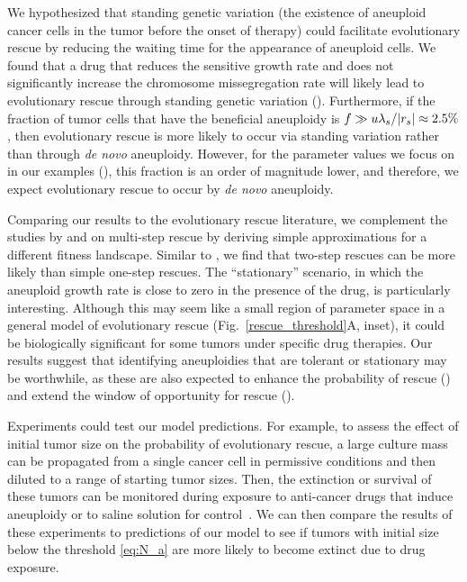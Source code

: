 \documentclass[12pt]{extarticle}
\renewcommand{\Delta}{r}
\begin{document}
We hypothesized that standing genetic variation (the existence of aneuploid cancer cells in the tumor before the onset of therapy) could facilitate evolutionary rescue by reducing the waiting time for the appearance of aneuploid cells. We found that a drug that reduces the sensitive growth rate and does not significantly increase the chromosome missegregation rate will likely lead to evolutionary rescue through standing genetic variation ().
Furthermore, if the fraction of tumor cells that have the beneficial aneuploidy is $f \gg u \lambda_s / \abs{\Delta_s} \approx2.5\%$, then evolutionary rescue is more likely to occur via standing variation rather than through \textit{de novo} aneuploidy. 
However, for the parameter values we focus on in our examples (), this fraction is an order of magnitude lower, and therefore, we expect evolutionary rescue to occur by \textit{de novo} aneuploidy.

Comparing our results to the evolutionary rescue literature, we complement the studies by \citet{iwasa2003evolutionary} and \citet{osmond_genetic_2020} on multi-step rescue by deriving simple approximations for a different fitness landscape. 
Similar to \citet{osmond_genetic_2020}, we find that two-step rescues can be more likely than simple one-step rescues. 
The ``stationary'' scenario, in which the aneuploid growth rate is close to zero in the presence of the drug, is particularly interesting.
Although this may seem like a small region of parameter space in a general model of evolutionary rescue (Fig.~\ref{rescue_threshold}A, inset), it could be biologically significant for some tumors under specific drug therapies.
Our results suggest that identifying aneuploidies that are tolerant or stationary may be worthwhile, as these are also expected to enhance the probability of rescue () and extend the window of opportunity for rescue ().

Experiments could test our model predictions. For example, to assess the effect of initial tumor size on the probability of evolutionary rescue, a large culture mass can be propagated from a single cancer cell in permissive conditions and then diluted to a range of starting tumor sizes. Then, the extinction or survival of these tumors can be monitored during exposure to anti-cancer drugs that induce aneuploidy or to saline solution for control~\citep{ippolito2021gene}. 
We can then compare the results of these experiments to predictions of our model to see if tumors with initial size below the threshold \cref{eq:N_a} are more likely to become extinct due to drug exposure.
\end{document}
